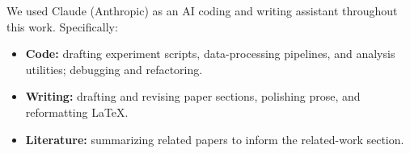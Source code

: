 We used Claude (Anthropic) as an AI coding and writing assistant throughout this work. Specifically:
\begin{itemize}
    \item \textbf{Code:} drafting experiment scripts, data-processing pipelines, and analysis utilities; debugging and refactoring.
    \item \textbf{Writing:} drafting and revising paper sections, polishing prose, and reformatting \LaTeX{}.
    \item \textbf{Literature:} summarizing related papers to inform the related-work section.
\end{itemize}
